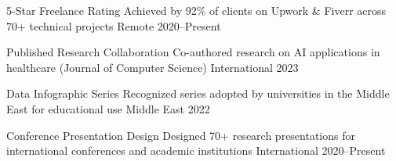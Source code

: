 

\begin{cvhonors}

  \cvhonor
    {5-Star Freelance Rating}
    {Achieved by 92\% of clients on Upwork \& Fiverr across 70+ technical projects}
    {Remote}
    {2020--Present}

  \cvhonor
    {Published Research Collaboration}
    {Co-authored research on AI applications in healthcare (Journal of Computer Science)}
    {International}
    {2023}

  \cvhonor
    {Data Infographic Series}
    {Recognized series adopted by universities in the Middle East for educational use}
    {Middle East}
    {2022}

  \cvhonor
    {Conference Presentation Design}
    {Designed 70+ research presentations for international conferences and academic institutions}
    {International}
    {2020--Present}

\end{cvhonors}
